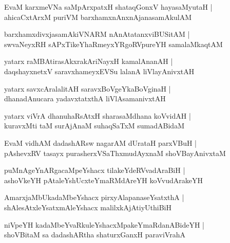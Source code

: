 \documentclass[twoside,12pt,openright]{book}
\newcounter{shloka}[chapter]
\begin{document}
\begin{shloka}%
EvaM karxmeVNa saMpArxpatxH shataqGonxV hayasaMyutaH |\\
ahicaCxtArxM puriVM barxhamxnAnxnAjanasamAkulAM 
\end{shloka}

\begin{shloka}%
barxhamxdivxjasamAkiVNARM nAnAtatanxviBUSitAM |\\
swvaNeyxRH sAPxTikeYhaRmeyxYRgoRVpureYH samalaMkaqtAM 
\end{shloka}

\begin{shloka}%
yatarx raMBAtirasAkxrakAriNayxH kamalAnanAH |\\
daqshayxnetxV saravxhameyxEVSu lalanA liVlayAnivxtAH 
\end{shloka}

\begin{shloka}%
yatarx savxcAralalitAH saravxBoVgeYkaBoVginaH |\\
dhanadAnucara yadavxtatxthA liVlAsamanivxtAH 
\end{shloka}

\begin{shloka}%
 yatarx viVrA dhanuhaRsAtxH sharasaMdhana koVvidAH |\\
 kuravxMti taM surAjAnaM suhaqSaTxM sumadABidaM 
\end{shloka}

\begin{shloka}%
EvaM vidhAM dadashARsw nagarAM dUrataH parxVBuH |\\
pAshevxRV tasayx purasherxVSaThxmudAyxnaM shoVBayAnivxtaM
\end{shloka}

\begin{shloka}%
puMnAgeYnARgacaMpeYshacx tilakeYdeRVvadAraBiH |\\
ashoVkeYH pAtaleYshUcxteYmaRMdAreYH koVvudArakeYH
\end{shloka}

\begin{shloka}%
AmarxjaMbUkadaMbeYshacx pirxyAlapanaseYsatxthA |\\
shAlesAtxleYsatxmAleYshacx malilxkAjAtiyUthiBiH
\end{shloka}

\begin{shloka}%
niVpeYH kadaMbeYvaRkuleYshacxMpakeYmaRdanABideYH |\\
shoVBitaM sa dadashARtha shaturxGanxH paraviVrahA 
\end{shloka}
\end{document}
